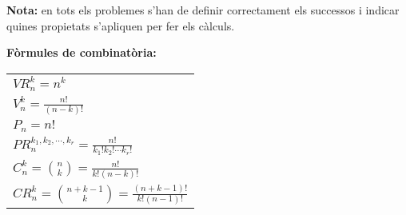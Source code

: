 \documentclass[a4paper,10pt]{article}
\begin{document}
\vskip 1cm
\noindent
\textbf{Nota:} en tots els problemes s'han de definir correctament els successos i indicar quines propietats
s'apliquen per fer els c\`alculs.

\vskip 1cm
\noindent
\textbf{F\`ormules de combinat\`oria:}

\begin{tabular}{l}
$\displaystyle VR_n^k=n^k$ \\
$\displaystyle V_n^k=\frac{n!}{(n-k)!}$ \\
$\displaystyle P_n = n!$ \\
$\displaystyle PR_n^{k_1, k_2, \cdots, k_r} = \frac{n!}{k_1! k_2! \cdots k_r!}$ \\
$\displaystyle C_n^k=\binom{n}{k}=\frac{n!}{k! (n-k)!}$ \\
$\displaystyle CR_n^k=\binom{n+k-1}{k}=\frac{(n+k-1)!}{k! (n-1)!}$ \\
\end{tabular}
\end{document}
